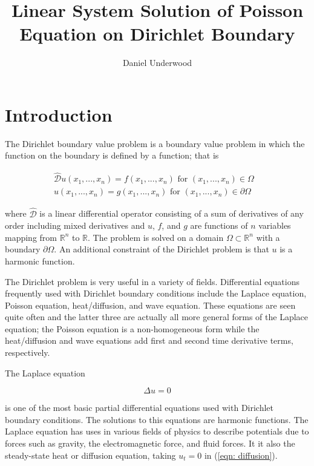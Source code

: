 \documentclass[10pt,a4paper]{article}
\author{Daniel Underwood}
\title{Linear System Solution of Poisson Equation on Dirichlet Boundary}
\begin{document}
\maketitle

\section*{Introduction}
The Dirichlet boundary value problem is a boundary value problem in which the function on the boundary is defined by a function; that is

\begin{subequations}
  \begin{align}
  \hat{\mathcal{D}} u(x_1 , ... , x_n) = f(x_1 , ... , x_n) \,\, \text{for} \,\, (x_1, ..., x_n) \in \Omega & \label{eqn: dirichlet 1}\\
  u(x_1, ..., x_n) = g(x_1, ..., x_n) \,\, \text{for} \,\, (x_1, ..., x_n) \in \partial\Omega \label{eqn: dirichlet 2}&
  \end{align}
\end{subequations}

where $\hat{\mathcal{D}}$ is a linear differential operator consisting of a sum of derivatives of any order including mixed derivatives and $u$, $f$, and $g$ are functions of $n$ variables mapping from $\mathbb{R}^n$ to $\mathbb{R}$. The problem is solved on a domain $\Omega \subset \mathbb{R}^n$ with a boundary $\partial \Omega$. An additional constraint of the Dirichlet problem is that $u$ is a harmonic function.

The Dirichlet problem is very useful in a variety of fields. Differential equations frequently used with Dirichlet boundary conditions include the  Laplace equation, Poisson equation, heat/diffusion, and wave equation. These equations are seen quite often and the latter three are actually all more general forms of the Laplace equation; the Poisson equation is a non-homogeneous form while the heat/diffusion and wave equations add first and second time derivative terms, respectively.

The Laplace equation

\begin{equation}
\Delta u = 0 \label{eqn: laplace}
\end{equation}

is one of the most basic partial differential equations used with Dirichlet boundary conditions. The solutions to this equations are harmonic functions. The Laplace equation has uses in various fields of physics to describe potentials due to forces such as gravity, the electromagnetic force, and fluid forces. It it also the steady-state heat or diffusion equation, taking $u_t = 0$ in (\ref{eqn: diffusion}).
\end{document}
